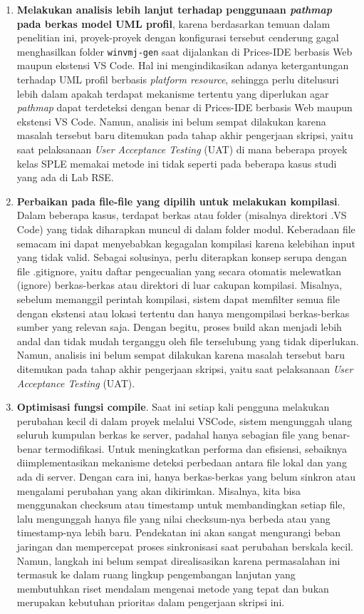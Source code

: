 \documentclass[12pt,a4paper,onecolumn]{article}
\begin{document}
\begin{enumerate}[leftmargin=*]
\item \textbf{Melakukan analisis lebih lanjut terhadap penggunaan \textit{pathmap} pada berkas model UML profil}, karena berdasarkan temuan dalam penelitian ini, proyek-proyek dengan konfigurasi tersebut cenderung gagal menghasilkan folder \texttt{winvmj-gen} saat dijalankan di Prices-IDE berbasis Web maupun ekstensi VS Code. Hal ini mengindikasikan adanya ketergantungan terhadap UML profil berbasis \textit{platform resource}, sehingga perlu ditelusuri lebih dalam apakah terdapat mekanisme tertentu yang diperlukan agar \textit{pathmap} dapat terdeteksi dengan benar di Prices-IDE berbasis Web maupun ekstensi VS Code. Namun, analisis ini belum sempat dilakukan karena masalah tersebut baru ditemukan pada tahap akhir pengerjaan skripsi, yaitu saat pelaksanaan \textit{User Acceptance Testing} (UAT) di mana beberapa proyek kelas SPLE memakai metode ini tidak seperti pada beberapa kasus studi yang ada di Lab RSE.

\item \textbf{Perbaikan pada file-file yang dipilih untuk melakukan kompilasi}. Dalam beberapa kasus, terdapat berkas atau folder (misalnya direktori .VS Code) yang tidak diharapkan muncul di dalam folder modul. Keberadaan file semacam ini dapat menyebabkan kegagalan kompilasi karena kelebihan input yang tidak valid. Sebagai solusinya, perlu diterapkan konsep serupa dengan file .gitignore, yaitu daftar pengecualian yang secara otomatis melewatkan (ignore) berkas-berkas atau direktori di luar cakupan kompilasi. Misalnya, sebelum memanggil perintah kompilasi, sistem dapat memfilter semua file dengan ekstensi atau lokasi tertentu dan hanya mengompilasi berkas-berkas sumber yang relevan saja. Dengan begitu, proses build akan menjadi lebih andal dan tidak mudah terganggu oleh file terselubung yang tidak diperlukan. Namun, analisis ini belum sempat dilakukan karena masalah tersebut baru ditemukan pada tahap akhir pengerjaan skripsi, yaitu saat pelaksanaan \textit{User Acceptance Testing} (UAT).


\item \textbf{Optimisasi fungsi compile}.  Saat ini setiap kali pengguna melakukan perubahan kecil di dalam proyek melalui VSCode, sistem mengunggah ulang seluruh kumpulan berkas ke server, padahal hanya sebagian file yang benar-benar termodifikasi. Untuk meningkatkan performa dan efisiensi, sebaiknya diimplementasikan mekanisme deteksi perbedaan antara file lokal dan yang ada di server. Dengan cara ini, hanya berkas-berkas yang belum sinkron atau mengalami perubahan yang akan dikirimkan. Misalnya, kita bisa menggunakan checksum atau timestamp untuk membandingkan setiap file, lalu mengunggah hanya file yang nilai checksum-nya berbeda atau yang timestamp-nya lebih baru. Pendekatan ini akan sangat mengurangi beban jaringan dan mempercepat proses sinkronisasi saat perubahan berskala kecil. Namun, langkah ini belum sempat direalisasikan karena permasalahan ini termasuk ke dalam ruang lingkup pengembangan lanjutan yang membutuhkan riset mendalam mengenai metode yang tepat dan bukan merupakan kebutuhan prioritas dalam pengerjaan skripsi ini.



\end{enumerate}
\end{document}
